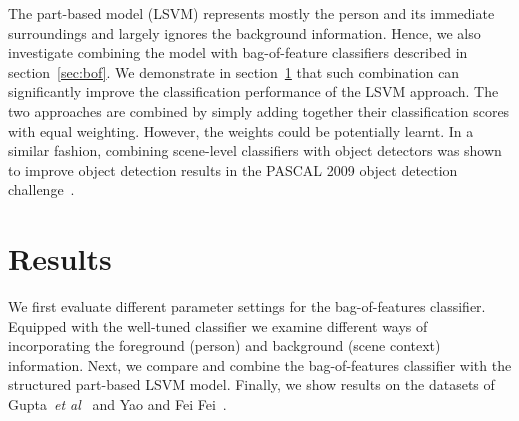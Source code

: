 \documentclass{bmvc2k}
\def\etal{\emph{et al}\bmvaOneDot}
\newcommand{\secnspc}{\vspace*{-3mm}}       %
\begin{document}
The part-based model (LSVM) represents mostly the person and its immediate surroundings
and largely ignores the background information. Hence, we also investigate
combining the model with bag-of-feature classifiers described in section~\ref{sec:bof}.
We demonstrate in section~\ref{sec:results}  that such combination can significantly improve
the classification performance of the LSVM approach. The two approaches are combined
 by simply adding together their classification scores with equal weighting. However,
the weights could be potentially learnt. %
In a similar fashion, combining scene-level classifiers with object detectors was shown to improve object detection results in the PASCAL 2009 object detection challenge~\cite{Harzallah09}.





% 
%




\secnspc
\section{Results}
\label{sec:results}
\secnspc

We first evaluate different parameter settings for the bag-of-features classifier.
Equipped with the well-tuned classifier we examine different ways of incorporating the foreground (person)
and background (scene context) information. Next, we compare and combine the bag-of-features classifier
with the structured part-based LSVM model. Finally, we show results on the datasets of Gupta~\etal~\cite{Gupta09} and Yao and Fei Fei~\cite{FeiFei10a}.
\end{document}
